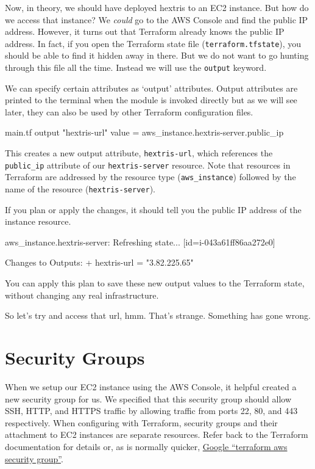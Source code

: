 \documentclass{csse4400}
\begin{document}
Now, in theory, we should have deployed hextris to an EC2 instance.
But how do we access that instance?
We \textsl{could} go to the AWS Console and find the public IP address.
However, it turns out that Terraform already knows the public IP address.
In fact, if you open the Terraform state file (\texttt{terraform.tfstate}),
you should be able to find it hidden away in there.
But we do not want to go hunting through this file all the time.
Instead we will use the \texttt{output} keyword.

We can specify certain attributes as `output' attributes.
Output attributes are printed to the terminal when the module is invoked directly
but as we will see later, they can also be used by other Terraform configuration files.

\begin{code}[language=terraform]{main.tf}
output "hextris-url" {
  value = aws_instance.hextris-server.public_ip
}
\end{code}

This creates a new output attribute, \texttt{hextris-url},
which references the \texttt{public\_ip} attribute of our \texttt{hextris-server} resource.
Note that resources in Terraform are addressed by the resource type (\texttt{aws\_instance})
followed by the name of the resource (\texttt{hextris-server}).

If you plan or apply the changes, it should tell you the public IP address of the instance resource.

\begin{code}[language=terraform-plan]{}
aws_instance.hextris-server: Refreshing state... [id=i-043a61ff86aa272e0]

Changes to Outputs:
  + hextris-url = "3.82.225.65"
\end{code}

You can apply this plan to save these new output values to the Terraform state, without changing any real infrastructure.  

So let's try and access that url, hmm.
That's strange. Something has gone wrong.

\section{Security Groups}
When we setup our EC2 instance using the AWS Console,
it helpful created a new security group for us.
We specified that this security group should allow SSH, HTTP, and HTTPS traffic by allowing traffic from ports 22, 80, and 443 respectively.
When configuring with Terraform, security groups and their attachment to EC2 instances are separate resources.
Refer back to the Terraform documentation for details or,
as is normally quicker, \href{https://www.google.com/search?q=terraform+aws+security+group}{Google ``terraform aws security group''}.
\end{document}

